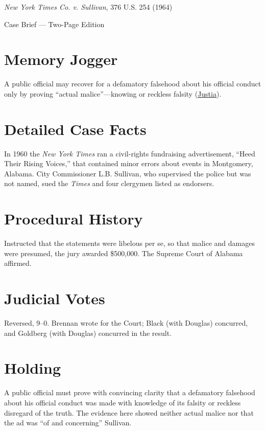 \documentclass[12pt]{article}
\begin{document}
\begin{center}
{\LARGE \textit{New York Times Co. v. Sullivan}, 376 U.S. 254 (1964)\par}
\vspace{0.5em}
{\large Case Brief --- Two-Page Edition\par}
\end{center}

\section{Memory Jogger}
A public official may recover for a defamatory falsehood about his official conduct only by proving ``actual malice''---knowing or reckless falsity (\href{https://supreme.justia.com/cases/federal/us/376/254/}{Justia}).

\section{Detailed Case Facts}
In 1960 the \textit{New York Times} ran a civil-rights fundraising advertisement, ``Heed Their Rising Voices,'' that contained minor errors about events in Montgomery, Alabama. City Commissioner L.B. Sullivan, who supervised the police but was not named, sued the \textit{Times} and four clergymen listed as endorsers.

\section{Procedural History}
Instructed that the statements were libelous per se, so that malice and damages were presumed, the jury awarded \$500,000. The Supreme Court of Alabama affirmed.

\section{Judicial Votes}
Reversed, 9--0. Brennan wrote for the Court; Black (with Douglas) concurred, and Goldberg (with Douglas) concurred in the result.

\section{Holding}
A public official must prove with convincing clarity that a defamatory falsehood about his official conduct was made with knowledge of its falsity or reckless disregard of the truth. The evidence here showed neither actual malice nor that the ad was ``of and concerning'' Sullivan.
\end{document}
